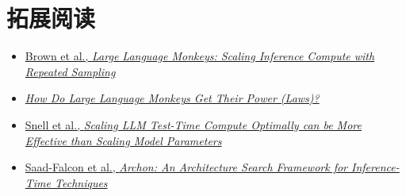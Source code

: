 \section{拓展阅读}

\begin{itemize}
    \item \href{https://arxiv.org/abs/2407.21787}{Brown et al., \emph{Large Language Monkeys: Scaling Inference Compute with Repeated Sampling}}
    \item \href{https://arxiv.org/abs/2502.17578}{\emph{How Do Large Language Monkeys Get Their Power (Laws)?}}
    \item \href{https://arxiv.org/abs/2408.03314}{Snell et al., \emph{Scaling LLM Test-Time Compute Optimally can be More Effective than Scaling Model Parameters}}
    \item \href{https://arxiv.org/abs/2409.15254}{Saad-Falcon et al., \emph{Archon: An Architecture Search Framework for Inference-Time Techniques}}
\end{itemize}

